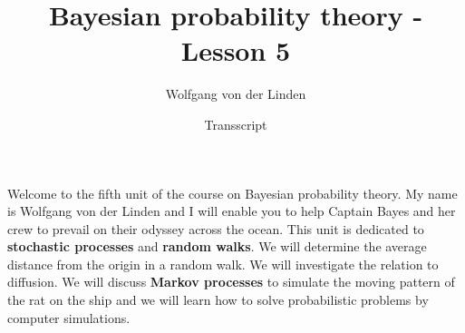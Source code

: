 \documentclass[12pt, a4paper]{scrartcl}
\title{Bayesian probability theory - Lesson 5}
\author{Wolfgang von der Linden}
\date{Transscript}
\begin{document}
\setlength{\parindent}{0pt}
\maketitle
\onehalfspacing

Welcome to the fifth unit of the course on Bayesian probability theory. 
My name is Wolfgang von der Linden and I will enable you to help Captain Bayes and her crew to prevail on their odyssey across the ocean.
This unit is dedicated to \textbf{stochastic processes} and \textbf{random walks}. We will determine the average distance from the origin in a random walk. We will investigate the relation to diffusion. We will discuss \textbf{Markov processes} to simulate the moving pattern of the rat on the ship and we will learn how to solve probabilistic problems by computer simulations.\\
\end{document}
